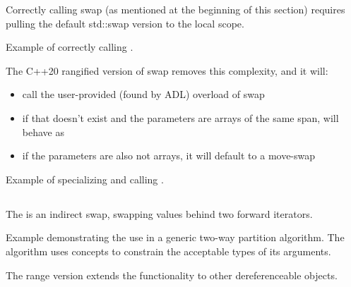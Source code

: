 
Correctly calling swap (as mentioned at the beginning of this section) requires pulling the default std::swap version to the local scope.

\begin{box-note}
\footnotesize Example of correctly calling .
\tcblower
{}
\end{box-note}
\newpage

The C++20 rangified version of swap removes this complexity, and it will:

\begin{itemize}
    \item call the user-provided (found by ADL) overload of swap
    \item if that doesn't exist and the parameters are arrays of the same span,  will behave as 
    \item if the parameters are also not arrays, it will default to a move-swap
\end{itemize}

\begin{box-note}
\footnotesize Example of specializing and calling .
\tcblower
{}
\end{box-note}

\subsection{\texorpdfstring{}{\texttt{std::iter\_swap}}}

The  is an indirect swap, swapping values behind two forward iterators.



\begin{box-note}
\footnotesize Example demonstrating the use  in a generic two-way partition algorithm. The algorithm uses concepts to constrain the acceptable types of its arguments.
\tcblower
{}
\end{box-note}

The range version extends the functionality to other dereferenceable objects.

